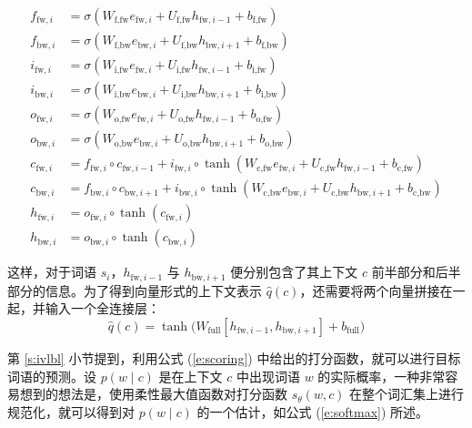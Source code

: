 \begin{align}
	f_{\text{fw}, i} &= \sigma(W_{\text{f}, \text{fw}} e_{\text{fw}, i} + U_{\text{f}, \text{fw}} h_{\text{fw}, i - 1} + b_{\text{f}, \text{fw}}) \label{e:bilstm begin} \\
	f_{\text{bw}, i} &= \sigma(W_{\text{f}, \text{bw}} e_{\text{bw}, i} + U_{\text{f}, \text{bw}} h_{\text{bw}, i + 1} + b_{\text{f}, \text{bw}}) \\
	i_{\text{fw}, i} &= \sigma(W_{\text{i}, \text{fw}} e_{\text{fw}, i} + U_{\text{i}, \text{fw}} h_{\text{fw}, i - 1} + b_{\text{i}, \text{fw}}) \\
	i_{\text{bw}, i} &= \sigma(W_{\text{i}, \text{bw}} e_{\text{bw}, i} + U_{\text{i}, \text{bw}} h_{\text{bw}, i + 1} + b_{\text{i}, \text{bw}}) \\
	o_{\text{fw}, i} &= \sigma(W_{\text{o}, \text{fw}} e_{\text{fw}, i} + U_{\text{o}, \text{fw}} h_{\text{fw}, i - 1} + b_{\text{o}, \text{fw}}) \\
	o_{\text{bw}, i} &= \sigma(W_{\text{o}, \text{bw}} e_{\text{bw}, i} + U_{\text{o}, \text{bw}} h_{\text{bw}, i + 1} + b_{\text{o}, \text{bw}}) \\
	c_{\text{fw}, i} &= f_{\text{fw}, i} \circ c_{\text{fw}, i - 1} + i_{\text{fw}, i} \circ \tanh(W_{\text{c}, \text{fw}} e_{\text{fw}, i} + U_{\text{c}, \text{fw}} h_{\text{fw}, i - 1} + b_{\text{c}, \text{fw}}) \\
	c_{\text{bw}, i} &= f_{\text{bw}, i} \circ c_{\text{bw}, i + 1} + i_{\text{bw}, i} \circ \tanh(W_{\text{c}, \text{bw}} e_{\text{bw}, i} + U_{\text{c}, \text{bw}} h_{\text{bw}, i + 1} + b_{\text{c}, \text{bw}}) \\
	h_{\text{fw}, i} &= o_{\text{fw}, i} \circ \tanh(c_{\text{fw}, i}) \\
	h_{\text{bw}, i} &= o_{\text{bw}, i} \circ \tanh(c_{\text{bw}, i}) \label{e:bilstm end}
\end{align}

这样，对于词语 $s_i$，$h_{\text{fw}, i - 1}$ 与 $h_{\text{bw}, i + 1}$ 便分别包含了其上下文 $c$ 前半部分和后半部分的信息。为了得到向量形式的上下文表示 $\hat{q}(c)$，还需要将两个向量拼接在一起，并输入一个全连接层：
\begin{equation}
\hat{q}(c) = \tanh\bigl(W_\text{full} [h_{\text{fw}, i - 1}, h_{\text{bw}, i + 1}] + b_\text{full}\bigr)
\end{equation}

第 \ref{s:ivlbl} 小节提到，利用公式 (\ref{e:scoring}) 中给出的打分函数，就可以进行目标词语的预测。设 $p(w \mid c)$ 是在上下文 $c$ 中出现词语 $w$ 的实际概率，一种非常容易想到的想法是，使用柔性最大值函数对打分函数 $s_\theta(w, c)$ 在整个词汇集上进行规范化，就可以得到对 $p(w \mid c)$ 的一个估计，如公式 (\ref{e:softmax}) 所述。

